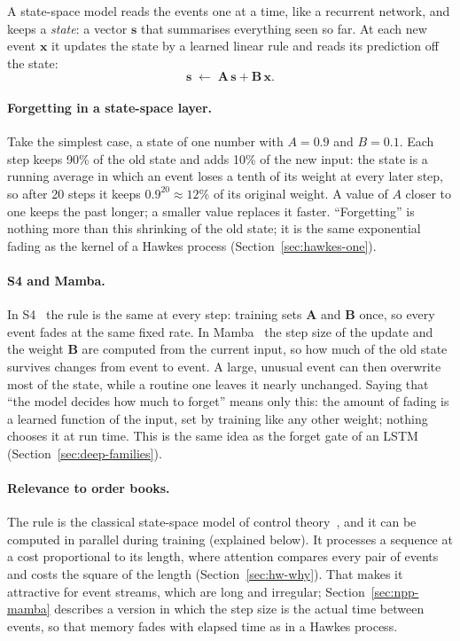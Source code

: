 A state-space model reads the events one at a time, like a recurrent network, and keeps a \emph{state}: a vector
$\mathbf{s}$ that summarises everything seen so far. At each new event $\mathbf{x}$ it updates the state by a learned
linear rule and reads its prediction off the state:
\[
  \mathbf{s} \;\leftarrow\; \mathbf{A}\,\mathbf{s} + \mathbf{B}\,\mathbf{x}.
\]

\paragraph{Forgetting in a state-space layer.} Take the simplest case, a state of one number with $A = 0.9$ and $B = 0.1$.
Each step keeps 90\% of the old state and adds 10\% of the new input: the state is a running average in which an event
loses a tenth of its weight at every later step, so after 20 steps it keeps $0.9^{20} \approx 12\%$ of its original
weight. A value of $A$ closer to one keeps the past longer; a smaller value replaces it faster. ``Forgetting'' is
nothing more than this shrinking of the old state; it is the same exponential fading as the kernel of a Hawkes process
(Section~\ref{sec:hawkes-one}).

\paragraph{S4 and Mamba.} In S4~\citep{gu2022s4} the rule is the same at every step: training sets $\mathbf{A}$ and
$\mathbf{B}$ once, so every event fades at the same fixed rate. In Mamba~\citep{gu2024mamba} the step size of the
update and the weight $\mathbf{B}$ are computed from the current input, so how much of the old state survives
changes from event to event. A large, unusual event can then overwrite most of the state, while a routine one leaves
it nearly unchanged. Saying that ``the model decides how much to forget'' means only this: the amount of fading is a
learned function of the input, set by training like any other weight; nothing chooses it at run time. This is the same
idea as the forget gate of an LSTM (Section~\ref{sec:deep-families}).

\paragraph{Relevance to order books.} The rule is the classical state-space model of control
theory~\citep{kalman1960}, and it can be computed in parallel during training (explained below). It processes a sequence at a cost
proportional to its length, where attention compares every pair of events and costs the square of the length
(Section~\ref{sec:hw-why}). That makes it attractive for event streams, which are long and irregular;
Section~\ref{sec:npp-mamba} describes a version in which the step size is the actual time between events, so that
memory fades with elapsed time as in a Hawkes process. 

